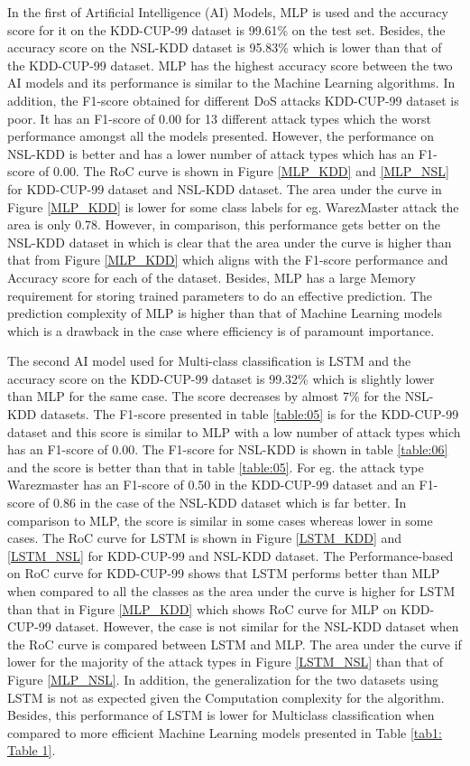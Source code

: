 \documentclass[conference]{IEEEtran}
\begin{document}
In the first of Artificial Intelligence (AI) Models, MLP is used and the accuracy score for it on the KDD-CUP-99 dataset is 99.61\% on the test set. Besides, the accuracy score on the NSL-KDD dataset is 95.83\% which is lower than that of the KDD-CUP-99 dataset. MLP has the highest accuracy score between the two AI models and its performance is similar to the Machine Learning algorithms. In addition, the F1-score obtained for different DoS attacks KDD-CUP-99 dataset is poor. It has an F1-score of 0.00 for 13 different attack types which the worst performance amongst all the models presented. However, the performance on NSL-KDD is better and has a lower number of attack types which has an F1-score of 0.00. The RoC curve is shown in Figure \ref{MLP_KDD} and \ref{MLP_NSL} for KDD-CUP-99 dataset and NSL-KDD dataset. The area under the curve in Figure \ref{MLP_KDD} is lower for some class labels for eg. WarezMaster attack the area is only 0.78. However, in comparison, this performance gets better on the NSL-KDD dataset in which is clear that the area under the curve is higher than that from Figure \ref{MLP_KDD} which aligns with the F1-score performance and Accuracy score for each of the dataset. Besides, MLP has a large Memory requirement for storing trained parameters to do an effective prediction. The prediction complexity of MLP is higher than that of Machine Learning models which is a drawback in the case where efficiency is of paramount importance.

The second AI model used for Multi-class classification is LSTM and the accuracy score on the KDD-CUP-99 dataset is 99.32\% which is slightly lower than MLP for the same case. The score decreases by almost 7\% for the NSL-KDD datasets. The F1-score presented in table \ref{table:05} is for the KDD-CUP-99 dataset and this score is similar to MLP with a low number of attack types which has an F1-score of 0.00. The F1-score for NSL-KDD is shown in table \ref{table:06} and the score is better than that in table \ref{table:05}. For eg. the attack type Warezmaster has an F1-score of 0.50 in the KDD-CUP-99 dataset and an F1-score of 0.86 in the case of the NSL-KDD dataset which is far better. In comparison to MLP, the score is similar in some cases whereas lower in some cases. The RoC curve for LSTM is shown in Figure \ref{LSTM_KDD} and \ref{LSTM_NSL} for KDD-CUP-99 and NSL-KDD dataset. The Performance-based on RoC curve for KDD-CUP-99 shows that LSTM performs better than MLP when compared to all the classes as the area under the curve is higher for LSTM than that in Figure \ref{MLP_KDD} which shows RoC curve for MLP on KDD-CUP-99 dataset. However, the case is not similar for the NSL-KDD dataset when the RoC curve is compared between LSTM and MLP. The area under the curve if lower for the majority of the attack types in Figure \ref{LSTM_NSL} than that of Figure \ref{MLP_NSL}. In addition, the generalization for the two datasets using LSTM is not as expected given the Computation complexity for the algorithm. Besides, this performance of LSTM is lower for Multiclass classification when compared to more efficient Machine Learning models presented in Table \ref{tab1: Table 1}. 
\end{document}
